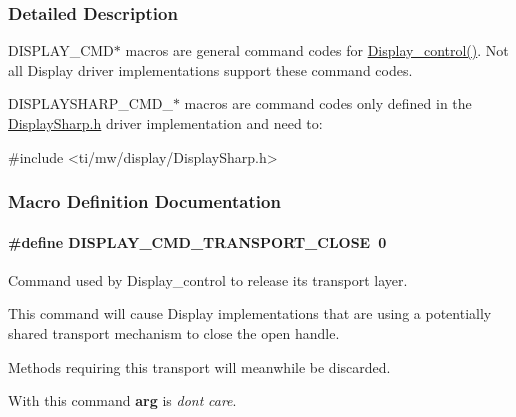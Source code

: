 \subsubsection{Detailed Description}
D\+I\+S\+P\+L\+A\+Y\+\_\+\+C\+M\+D$\ast$ macros are general command codes for \hyperlink{_display_8h_ad623d21e3c6d821bf6f4bdcfa05ec21f}{Display\+\_\+control()}. Not all Display driver implementations support these command codes.

D\+I\+S\+P\+L\+A\+Y\+S\+H\+A\+R\+P\+\_\+\+C\+M\+D\+\_\+$\ast$ macros are command codes only defined in the \hyperlink{_display_sharp_8h}{Display\+Sharp.\+h} driver implementation and need to\+: 
\begin{DoxyCode}
\textcolor{preprocessor}{#include <ti/mw/display/DisplaySharp.h>}
\end{DoxyCode}
 

\subsubsection{Macro Definition Documentation}
\paragraph[{D\+I\+S\+P\+L\+A\+Y\+\_\+\+C\+M\+D\+\_\+\+T\+R\+A\+N\+S\+P\+O\+R\+T\+\_\+\+C\+L\+O\+S\+E}]{\setlength{\rightskip}{0pt plus 5cm}\#define D\+I\+S\+P\+L\+A\+Y\+\_\+\+C\+M\+D\+\_\+\+T\+R\+A\+N\+S\+P\+O\+R\+T\+\_\+\+C\+L\+O\+S\+E~0}\label{group___d_i_s_p_l_a_y___c_m_d_ga5be24ea4a3ddfd94efbb513d649ac88b}


Command used by Display\+\_\+control to release its transport layer. 

This command will cause Display implementations that are using a potentially shared transport mechanism to close the open handle.

Methods requiring this transport will meanwhile be discarded.

With this command {\bfseries arg} is {\itshape don\textquotesingle{}t} {\itshape care}. 
